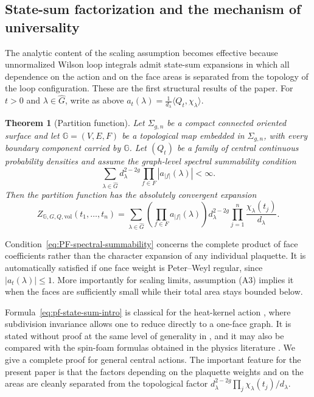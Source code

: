 \documentclass[11pt,a4paper,reqno]{article}
\newtheorem{theorem}{Theorem}[section]
\theoremstyle{definition}
\theoremstyle{remark}
\newcommand\vol{\mathrm{vol}}
\newcommand\Gbb{{\mathbb{G}}}
\begin{document}
\subsection{State-sum factorization and the mechanism of universality}

The analytic content of the scaling assumption becomes effective because unnormalized Wilson loop integrals admit state-sum expansions in which all dependence on the action and on the face areas is separated from the topology of the loop configuration. These are the first structural results of the paper. For $t>0$ and $\lambda\in\widehat G$, write as above $a_t(\lambda)=\frac{1}{d_\lambda}\langle Q_t,\chi_\lambda\rangle$.

\begin{theorem}[Partition function]\label{thm:Fourier_PF}
Let $\Sigma_{g,n}$ be a compact connected oriented surface and let $\Gbb=(V,E,F)$ be a topological map embedded in $\Sigma_{g,n}$, with every boundary component carried by $\Gbb$. Let $(Q_t)$ be a family of central continuous probability densities and assume the graph-level spectral summability condition
\begin{equation}\label{eq:PF-spectral-summability}
 \sum_{\lambda\in\widehat G}
 d_\lambda^{2-2g}
 \prod_{f\in F}|a_{|f|}(\lambda)|<\infty.
\end{equation}
Then the partition function has the absolutely convergent expansion
\begin{equation}\label{eq:pf-state-sum-intro}
 Z_{\Gbb,G,Q,\vol}(t_1,\ldots,t_n)
 =\sum_{\lambda\in\widehat G}
 \left(\prod_{f\in F}a_{|f|}(\lambda)\right)
 d_\lambda^{2-2g}\prod_{j=1}^n\frac{\chi_\lambda(t_j)}{d_\lambda}.
\end{equation}
\end{theorem}

Condition~\eqref{eq:PF-spectral-summability} concerns the complete product of face coefficients rather than the character expansion of any individual plaquette. It is automatically satisfied if one face weight is Peter--Weyl regular, since $|a_t(\lambda)|\leq1$. More importantly for scaling limits, assumption (A3) implies it when the faces are sufficiently small while their total area stays bounded below.

Formula~\eqref{eq:pf-state-sum-intro} is classical for the heat-kernel action \cite{Rus90,Wit91,BlauThom92}, where subdivision invariance allows one to reduce directly to a one-face graph. It is stated without proof at the same level of generality in \cite{DangNohra26}, and it may also be compared with the spin-foam formulas obtained in the physics literature \cite{OeckPfei01}. We give a complete proof for general central actions. The important feature for the present paper is that the factors depending on the plaquette weights and on the areas are cleanly separated from the topological factor $d_\lambda^{2-2g}\prod_j\chi_\lambda(t_j)/d_\lambda$.
\end{document}
